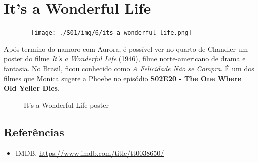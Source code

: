\hypertarget{its-a-wonderful-life}{%
\section{It's a Wonderful Life}\label{its-a-wonderful-life}}

\begin{figure}[!ht]
  \begin{adjustwidth}{-\oddsidemargin-1in}{-\rightmargin}
    \centering
    \texttt{[image: ./S01/img/6/its-a-wonderful-life.png]}
  \end{adjustwidth}
\end{figure}

Após termino do namoro com Aurora, é possível ver no quarto de Chandler
um poster do filme \emph{It's a Wonderful Life} (1946), filme
norte-americano de drama e fantasia. No Brasil, ficou conhecido como
\emph{A Felicidade Não se Compra}. É um dos filmes que Monica sugere a
Phoebe no episódio
\textbf{\textcolor{primarycolor}{S02E20 - The One Where Old Yeller Dies}}.

\begin{figure}
  \centering
    \caption{It’s a Wonderful Life poster\label{fig:it-s-a-wonderful-life-poster}}
\end{figure}

\hypertarget{referuxeancias-4}{%
\subsection{Referências}\label{referuxeancias-4}}

\begin{itemize}
\tightlist
\item
  \sloppy IMDB. \url{https://www.imdb.com/title/tt0038650/}
\end{itemize}
